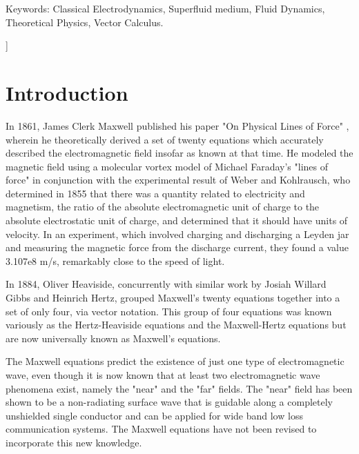 \documentclass[twoside,final]{article}
\begin{document}
\begin{center}
{{Keywords: Classical Electrodynamics, Superfluid medium, Fluid Dynamics,
Theoretical Physics, Vector Calculus.


}}\smallskip
\end{center}]{%


\setcounter{section}{0}
\setcounter{equation}{0}
\setcounter{figure}{0}
\setcounter{table}{0}
\setcounter{page}{1}




\section{Introduction}


In 1861, James Clerk Maxwell published his paper "On Physical Lines of Force"
\cite{Maxwell1861}, wherein he theoretically derived a set of twenty equations
which accurately described the electromagnetic field insofar as known at that
time. He modeled the magnetic field using a molecular vortex model of Michael
Faraday's "lines of force" in conjunction with the experimental result of Weber
and Kohlrausch, who determined in 1855 that there was a quantity related to
electricity and magnetism, the ratio of the absolute electromagnetic unit of
charge to the absolute electrostatic unit of charge, and determined that it
should have units of velocity. In an experiment, which involved charging and
discharging a Leyden jar and measuring the magnetic force from the discharge
current, they found a value 3.107e8 m/s, remarkably close to the speed of light.

In 1884, Oliver Heaviside, concurrently with similar work by Josiah Willard 
Gibbs and Heinrich Hertz, grouped Max\-well's twenty equations together into a set
of only four, via vector notation. This group of four equations was known
variously as the Hertz-Heaviside equations and the Maxwell-Hertz equations but
are now universally known as Maxwell's equations. 

The Maxwell equations predict the existence of just one type of electromagnetic
wave, even though it is now known that at least two electro\-magnetic wave
phenomena exist, name\-ly the "near" and the "far" fields. The "near" field has
been shown to be a non-radiating surface wave that is guidable along a
completely unshielded single conductor \cite{Elmore2019} and can be applied for
wide band low loss communication systems. The Maxwell equations have not been
revised to incorporate this new knowledge.

}
\end{document}
